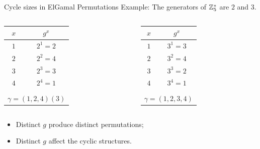 \begin{frame}{Cycle sizes in ElGamal Permutations}
Example: The generators of $\mathbb{Z}_5^*$ are  $2$ and $3$.

    \begin{columns}
        \begin{column}{0.45\textwidth}
        \centering
    	    \begin{tabular}{c|c}
    	        $x$ & $g^{x} $ \\ \hline \hline
    	        $1$ & $2^{1} = 2$ \\
    	        $2$ & $2^{2} = 4$ \\
    	        $3$ & $2^{3} = 3$ \\
              $4$ & $2^{4} = 1$  \\
                \multicolumn{2}{c}{} \\
              \multicolumn{2}{c}{$\gamma = (1,2,4)(3)$}
    	    \end{tabular}
        \end{column}
        \begin{column}{0.45\textwidth}
    	    \centering
    	    \begin{tabular}{c|c}
    	        $x$ & $g^{x} $ \\ \hline \hline
    	        $1$ & $3^{1} = 3$ \\
    	        $2$ & $3^{2} = 4$ \\
    	        $3$ & $3^{3} = 2$ \\
    	        $4$ & $3^{4} = 1$  \\
                \multicolumn{2}{c}{} \\
              \multicolumn{2}{c}{$\gamma  = (1,2,3,4)$}
    	    \end{tabular}
        \end{column}
  \end{columns}
  
  \pause
  \begin{itemize}
      \item Distinct $g$ produce distinct permutations;
      \item Distinct $g$ affect the cyclic structures.
  \end{itemize}
  
\end{frame}


